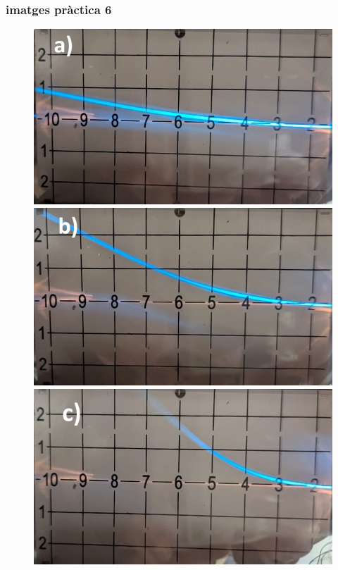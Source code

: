 \documentclass[11pt]{article}
\numberwithin{equation}{section}
\numberwithin{figure}{section}
\numberwithin{table}{section}
\begin{document}
\subsubsection{imatges pràctica 6}
\begin{figure}[H]
    \centering
    \begin{minipage}{0.38\textwidth}
        \centering
        \includegraphics[width=\textwidth]{1kV.jpg}
    \end{minipage}
    \begin{minipage}{0.38\textwidth}
        \centering
        \includegraphics[width=\textwidth]{2kV.jpg}
    \end{minipage}
    \begin{minipage}{0.38\textwidth}
        \centering
        \includegraphics[width=\textwidth]{3kV.jpg}

\end{minipage}
\end{figure}
\end{document}
